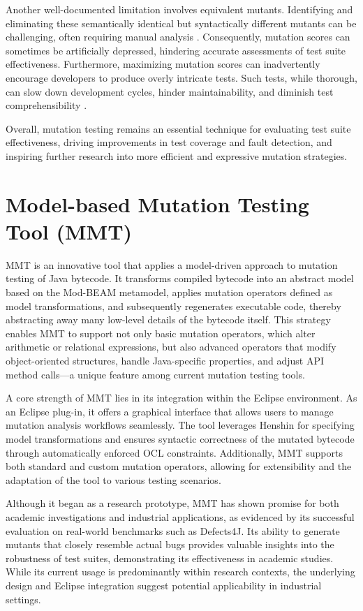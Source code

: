 \documentclass[12pt,a4paper]{article}
\begin{document}
Another well-documented limitation involves equivalent mutants. Identifying
and eliminating these semantically identical but syntactically different
mutants can be challenging, often requiring manual analysis
\cite{jia_analysis_2011}. Consequently, mutation scores can sometimes be
artificially depressed, hindering accurate assessments of test suite
effectiveness. Furthermore, maximizing mutation scores can inadvertently
encourage developers to produce overly intricate tests. Such tests, while
thorough, can slow down development cycles, hinder maintainability, and
diminish test comprehensibility \cite{offutt_mutation_2001,jia_analysis_2011}.

Overall, mutation testing remains an essential technique for evaluating test
suite effectiveness, driving improvements in test coverage and fault
detection, and inspiring further research into more efficient and expressive
mutation strategies.

\section{Model-based Mutation Testing Tool (MMT)}

MMT is an innovative tool that applies a model-driven approach to mutation
testing of Java bytecode. It transforms compiled bytecode into an abstract
model based on the Mod-BEAM metamodel, applies mutation operators defined as
model transformations, and subsequently regenerates executable code, thereby
abstracting away many low-level details of the bytecode itself. This strategy
enables MMT to support not only basic mutation operators, which alter
arithmetic or relational expressions, but also advanced operators that modify
object-oriented structures, handle Java-specific properties, and adjust API
method calls—a unique feature among current mutation testing tools.

A core strength of MMT lies in its integration within the Eclipse
environment. As an Eclipse plug-in, it offers a graphical interface that
allows users to manage mutation analysis workflows seamlessly. The tool
leverages Henshin for specifying model transformations and ensures syntactic
correctness of the mutated bytecode through automatically enforced OCL
constraints. Additionally, MMT supports both standard and custom mutation
operators, allowing for extensibility and the adaptation of the tool to
various testing scenarios.

Although it began as a research prototype, MMT has shown promise for both
academic investigations and industrial applications, as evidenced by its
successful evaluation on real-world benchmarks such as Defects4J. Its ability
to generate mutants that closely resemble actual bugs provides valuable
insights into the robustness of test suites, demonstrating its effectiveness
in academic studies. While its current usage is predominantly within research
contexts, the underlying design and Eclipse integration suggest potential
applicability in industrial settings.
\end{document}

